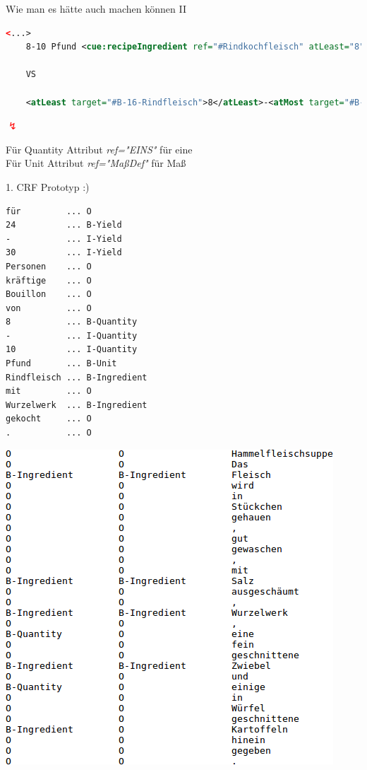\documentclass[12pt]{beamer}
\begin{document}
\begin{frame}[fragile]{Wie man es hätte auch machen können II}
	\begin{lstlisting}[language=XML]
	<...>
	8-10 Pfund <cue:recipeIngredient ref="#Rindkochfleisch" atLeast="8" atMost="10" unit="Pfund">Rindfleisch</cue:recipeIngredient>
	
	VS
	
	<atLeast target="#B-16-Rindfleisch">8</atLeast>-<atMost target="#B-16-Rindfleisch">10</atMost> <unit target="#B-16-Rindfleisch">Pfund</unit> <recipeIngredient xml:id="B-16-Rindfleisch" ref="#Suppenrindfleisch">Rindfleisch</recipeIngredient>
	\end{lstlisting}
	
	\begin{center}
		\textcolor{red}{\Large{$\lightning$}}
	\end{center}
	Für Quantity Attribut \textit{ref="EINS"} für eine \\
	Für Unit Attribut \textit{ref="MaßDef"} für Maß
\end{frame}


\begin{frame}[fragile]{1. CRF Prototyp :)}
	\vspace{-0.7em}\begin{lstlisting}
für			...	O
24			... B-Yield
-			... I-Yield
30			... I-Yield
Personen	...	O
kräftige	... O
Bouillon	... O
von			...	O
8			...	B-Quantity
-			...	I-Quantity
10			...	I-Quantity
Pfund		...	B-Unit
Rindfleisch	... B-Ingredient
mit			...	O
Wurzelwerk	...	B-Ingredient
gekocht		...	O
.			...	O
	\end{lstlisting}
\end{frame}	

\begin{frame}
	\includegraphics[scale=0.9]{Images/crfPrototypTagging}
\end{frame}
\end{document}
